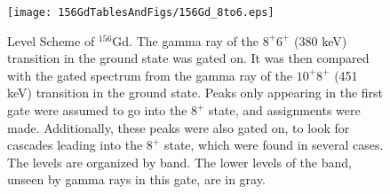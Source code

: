 \begin{figure}
    \centering
    \texttt{[image: 156GdTablesAndFigs/156Gd\_8to6.eps]}
    \caption{Level Scheme of $^{156}$Gd. The gamma ray of the $8^+$\rightarrow$6^+$ (380 keV) transition in the ground state was gated on. It was then compared with the gated spectrum from the gamma ray of the $10^+$\rightarrow$8^+$ (451 keV) transition in the ground state. Peaks only appearing in the first gate were assumed to go into the $8^+$ state, and assignments were made. Additionally, these peaks were also gated on, to look for cascades leading into the $8^+$ state, which were found in several cases. The levels are organized by band. The lower levels of the band, unseen by gamma rays in this gate, are in gray.}
    \label{fig:156_8to6}
\end{figure}